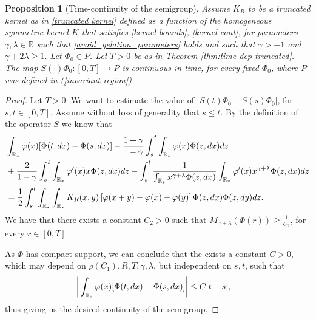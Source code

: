 \documentclass[11pt]{article}
\numberwithin{equation}{section}
\theoremstyle{plain}
\newtheorem{proposition}[theorem]{Proposition}
\newcommand{\der}{\textup{d}}
\begin{document}
\begin{proposition}[Time-continuity of the semigroup]\label{prop:time cont} 
Assume $K_R $ to be a truncated kernel as in \eqref{truncated kernel} defined as a function of the homogeneous symmetric kernel $K$ that satisfies \eqref{kernel bounds},  \eqref{kernel cont},  for parameters $\gamma, \lambda \in \mathbb R$ such that \eqref{avoid_gelation_parameters} holds and such that $\gamma > -1$ and $\gamma + 2 \lambda \geq 1 $. 
Let $\Phi_0\in P$. Let $T>0$ be as in Theorem \ref{thm:time dep truncated}. 
The map $S(\cdot)\Phi_0:[0,T]\rightarrow  P$ is continuous in time, for every fixed $\Phi_{0}$, where $P$ was defined in (\ref{invariant region}).
\end{proposition}
\begin{proof}
Let $T>0$. We want to estimate the value of $|S(t) \Phi_0- S(s) \Phi_0|$, for $s,t\in[0,T]$. Assume without loss of generality that $s\leq t$. 
By the definition of the operator $S$ we know that
\begin{align*}
& \int_{\mathbb R_*} \varphi(x) [{\Phi}(t, \der x)-{\Phi}(s, \der x)]- \frac{1+\gamma}{1-\gamma} \int_{s}^{t}\int_{\mathbb R_*}  \varphi(x) \Phi(z, \der x)\der z  \\
&+ \frac{2}{1-\gamma} \int_{s}^{t}\int_{\mathbb R_*}  \varphi'(x) x \Phi(z, \der x)\der z 
 - \int_{s}^{t} \frac{1}{\int_{\mathbb R_*}x^{\gamma +\lambda}\Phi(z,\der x)} \int_{\mathbb R_*}  \varphi'(x) x^{\gamma + \lambda}\Phi(z, \der x)\der z \nonumber \\
& =\frac{1}{2}\int_{s}^{t}\int_{\mathbb R_*} \int_{\mathbb R_*} K_R(x,y) \left[ \varphi(x+y)- \varphi(x) - \varphi(y) \right] \Phi(z, \der x) \Phi(z, \der y)\der z. \nonumber 
\end{align*}
We have that there exists a constant $C_{2}>0$ such that $M_{\gamma+\lambda}(\Phi(r))\geq \frac{1}{C_{2}}$, for every $r\in[0,T]$.

As $\Phi$ has compact support, we can conclude that the exists a constant $C>0$, which may depend on $\rho(C_{1}),R,T, \gamma,\lambda$, but independent on $s,t$, such that 
\begin{align*}
    \bigg|& \int_{\mathbb R_*} \varphi(x) [{\Phi}(t, \der x)-{\Phi}(s, \der x)]\bigg|\leq C|t-s|,
\end{align*}
thus giving us the desired continuity of the semigroup.
\end{proof}
\end{document}
